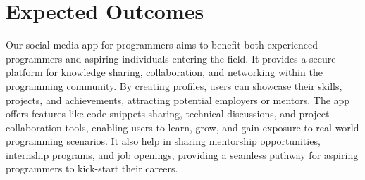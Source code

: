 \documentclass{article}
\begin{document}
\section{Expected Outcomes}
Our social media app for programmers aims to benefit both experienced programmers and aspiring individuals entering the field. It provides a secure platform for knowledge sharing, collaboration, and networking within the programming community. By creating profiles, users can showcase their skills, projects, and achievements, attracting potential employers or mentors. The app offers features like code snippets sharing, technical discussions, and project collaboration tools, enabling users to learn, grow, and gain exposure to real-world programming scenarios. It also help in sharing mentorship opportunities, internship programs, and job openings, providing a seamless pathway for aspiring programmers to kick-start their careers.
\end{document}
